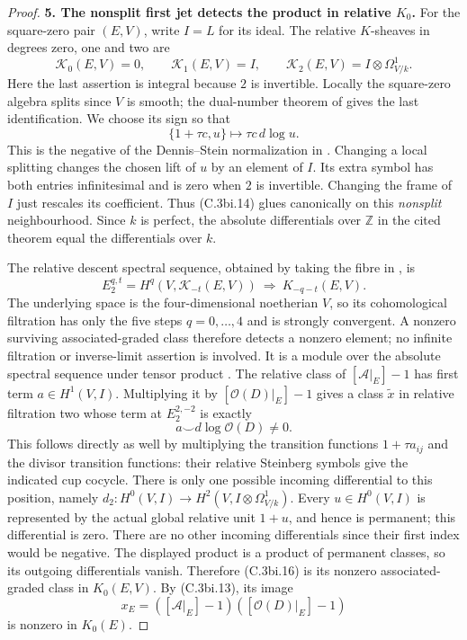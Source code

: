 \begin{proof}
\textbf{5. The nonsplit first jet detects the product in relative $K_0$.}
For the square-zero pair $(E,V)$, write $I=L$ for its ideal.
The relative $K$-sheaves in degrees zero, one and two are
\[
 \mathcal K_0(E,V)=0,\qquad
 \mathcal K_1(E,V)=I,\qquad
 \mathcal K_2(E,V)=I\otimes\Omega^1_{V/k}.
 \tag{C.3bi.14}
\]
Here the last assertion is integral because $2$ is invertible.
Locally the square-zero algebra splits since $V$ is smooth; the
dual-number theorem of \citet[unnumbered theorem and corollary,
p.~A1204]{frVanDerKallen1971} gives the last identification. We choose
its sign so that
\[
 \{1+\tau c,u\}\longmapsto\tau c\,d\log u.
\]
This is the negative of the Dennis--Stein normalization in
\citet[Chapter III, Exercise 5.14]{frWeibelKbookIII}. Changing a local
splitting changes the chosen lift of $u$ by an element of $I$.
Its extra symbol has both entries infinitesimal and is zero when
$2$ is invertible. Changing the frame of $I$ just rescales its
coefficient. Thus (C.3bi.14) glues canonically on this \emph{nonsplit}
neighbourhood. Since $k$ is perfect, the absolute differentials over
$\mathbb Z$ in the cited theorem equal the differentials over $k$.

The relative descent spectral sequence, obtained by taking the fibre
in \citet[Theorem 10.3]{D_ThomasonTrobaugh1990}, is
\[
 E_2^{q,t}=H^q(V,\mathcal K_{-t}(E,V))
 \ \Longrightarrow\ K_{-q-t}(E,V).
 \tag{C.3bi.15}
\]
The underlying space is the four-dimensional noetherian $V$, so
its cohomological filtration has only the five steps $q=0,\ldots,4$
and is strongly convergent. A nonzero surviving associated-graded
class therefore detects a nonzero element; no infinite filtration
or inverse-limit assertion is involved.
It is a module over the absolute spectral sequence under tensor product
\citep[Section 3.15]{D_ThomasonTrobaugh1990}. The relative class of
$[\mathcal A|_E]-1$ has first term $a\in H^1(V,I)$.
Multiplying it by $[\mathcal O(D)|_E]-1$ gives a class $\widetilde x$
in relative filtration two whose term at $E_2^{2,-2}$ is exactly
\[
 a\smile d\log\mathcal O(D)\ne0.
 \tag{C.3bi.16}
\]
This follows directly as well by multiplying the transition functions
$1+\tau a_{ij}$ and the divisor transition functions: their relative
Steinberg symbols give the indicated cup cocycle.
There is only one possible incoming differential to this position,
namely $d_2:H^0(V,I)\to H^2(V,I\otimes\Omega^1_{V/k})$.
Every $u\in H^0(V,I)$ is represented by the actual global relative
unit $1+u$, and hence is permanent; this differential is zero.
There are no other incoming differentials since their first index
would be negative. The displayed product is a product of permanent
classes, so its outgoing differentials vanish. Therefore (C.3bi.16)
is its nonzero associated-graded class in $K_0(E,V)$.
By (C.3bi.13), its image
\[
 x_E=([\mathcal A|_E]-1)([\mathcal O(D)|_E]-1)
 \tag{C.3bi.17}
\]
is nonzero in $K_0(E)$.


\end{proof}
